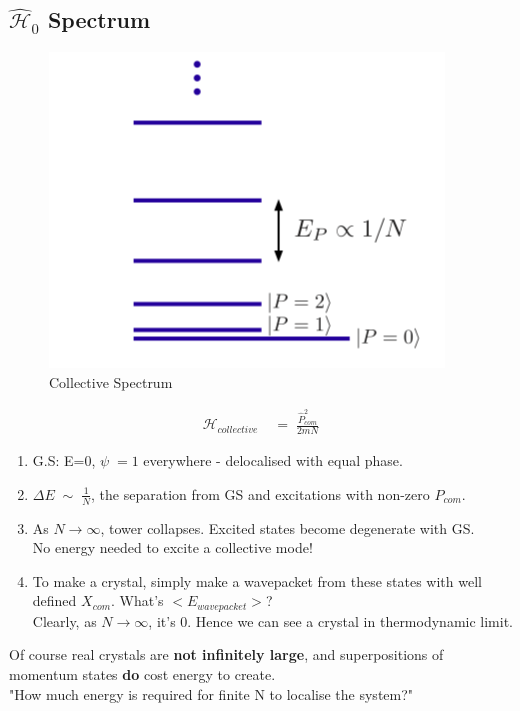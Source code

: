\documentclass[12pt]{article}
\begin{document}
\subsection{$\mathcal{\hat{H}}_0$ Spectrum}

\begin{figure}[h]
    \centering
    \includegraphics[scale=0.8]{Screen Shot 2020-07-22 at 19.42.20.png}
    \caption{Collective Spectrum}
    \label{fig:my_label}
\end{figure}
\begin{align}
    \mathcal{H}_{collective}\;&=\;\frac{\hat{P}^2_{com}}{2mN}
\end{align}
\begin{enumerate}
    \item G.S: E=0, $\psi\;=1$ everywhere - delocalised with equal phase.
    \item
    $\Delta E\;\sim\;\frac{1}{N}$, the separation from GS and excitations with non-zero $P_{com}$.
    \item As ${N\to\infty}$, tower collapses. Excited states become degenerate with GS.\\
    No energy needed to excite a collective mode!
    \item To make a crystal, simply make a wavepacket from these states with well defined $X_{com}$. What's $<E_{wavepacket}>$?\\
    Clearly, as ${N\to\infty}$, it's 0. Hence we can see a crystal in thermodynamic limit.
\end{enumerate}
Of course real crystals are \textbf{not infinitely large}, and superpositions of momentum states \textbf{do} cost energy to create.\\
\newline
"How much energy is required for finite N to localise the system?"\\
\end{document}
